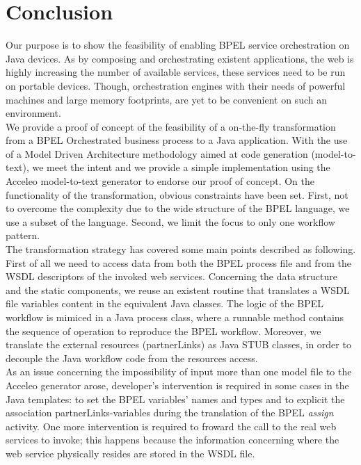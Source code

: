 \section{Conclusion}
\label{Conclusion}
Our purpose is to show the feasibility of enabling BPEL service orchestration on Java devices. As by composing and orchestrating existent applications, the web is highly increasing the number of available services, these services need to be run on portable devices. Though, orchestration engines with their needs of powerful machines and large memory footprints, are yet to be convenient on such an environment.\\
We provide a proof of concept of the feasibility of a on-the-fly transformation from a BPEL Orchestrated business process to a Java application. 
With the use of a Model Driven Architecture methodology aimed at code generation (model-to-text), we meet the intent and we provide a simple implementation using the Acceleo model-to-text generator to endorse our proof of concept.
On the functionality of the transformation, obvious constraints have been set. First, not to overcome the complexity due to the wide structure of the BPEL language, we use a subset of the language. Second, we limit the focus to only one workflow pattern.\\


The transformation strategy has covered some main points described as following. First of all we need to access data from both the BPEL process file and from the WSDL descriptors of the invoked web services. 
Concerning the data structure and the static components, we reuse an existent routine that translates a WSDL file variables content in the equivalent Java classes. 
The logic of the BPEL workflow is mimiced in a Java process class, where a runnable method contains the sequence of operation to reproduce the BPEL workflow.
Moreover, we translate the external resources (partnerLinks) as Java STUB classes, in order to decouple the Java workflow code from the resources access.\\


As an issue concerning the impossibility of input more than one model file to the Acceleo generator arose, developer's intervention is required in some cases in the Java templates: to set the BPEL variables' names and types and to explicit the association partnerLinks-variables during the translation of the BPEL \textit{assign} activity. One more intervention is required to froward the call to the real web services to invoke; this happens because the information concerning where the web service physically resides are stored in the WSDL file.

